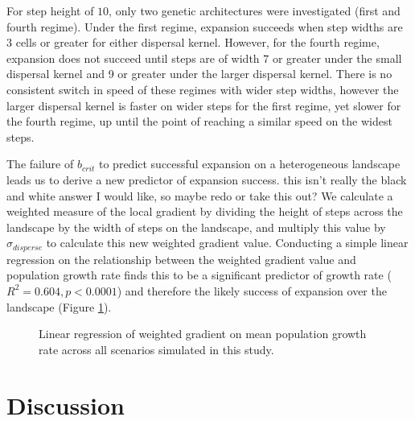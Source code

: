 For step height of $10$, only two genetic architectures were investigated (first and fourth regime). Under the first regime, expansion succeeds when step widths are $3$ cells or greater for either dispersal kernel. However, for the fourth regime, expansion does not succeed until steps are of width $7$ or greater under the small dispersal kernel and 9 or greater under the larger dispersal kernel. There is no consistent switch in speed of these regimes with wider step widths, however the larger dispersal kernel is faster on wider steps for the first regime, yet slower for the fourth regime, up until the point of reaching a similar speed on the widest steps.

The failure of $b_{crit}$ to predict successful expansion on a heterogeneous landscape leads us to derive a new predictor of expansion success. \color{red}this isn't really the black and white answer I would like, so maybe redo or take this out? \color{black} We calculate a weighted measure of the local gradient by dividing the height of steps across the landscape by the width of steps on the landscape, and multiply this value by $\sigma_{disperse}$ to calculate this new weighted gradient value. Conducting a simple linear regression on the relationship between the weighted gradient value and population growth rate finds this to be a significant predictor of growth rate ($R^2 = 0.604, p < 0.0001$) and therefore the likely success of expansion over the landscape (Figure \ref{fig:linearmodel}).

\begin{figure}[h]
\centering
{}
\caption[Linear regression of weighted gradient on population growth rate.]{Linear regression of weighted gradient on mean population growth rate across all scenarios simulated in this study.}
\label{fig:linearmodel}
\end{figure}



\section{Discussion}

